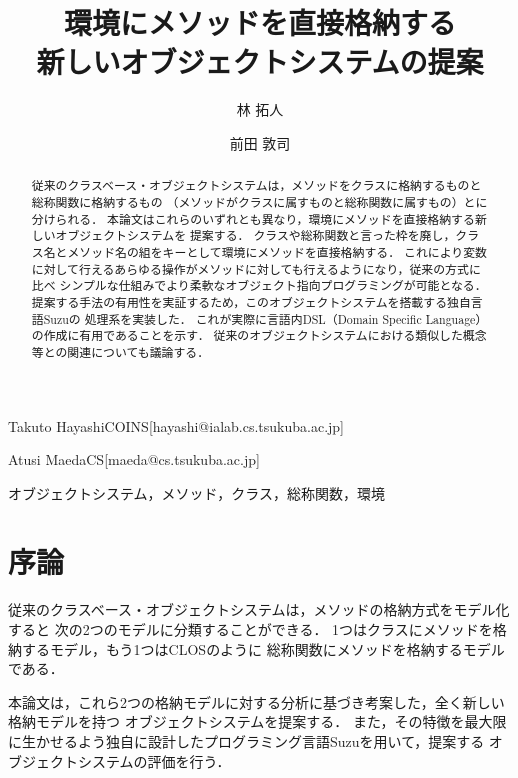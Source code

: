 \documentclass{ipsjprosym}
\begin{document}
\title{環境にメソッドを直接格納する \\ 新しいオブジェクトシステムの提案}


\author{林 拓人}{Takuto Hayashi}{COINS}[hayashi@ialab.cs.tsukuba.ac.jp]
\author{前田 敦司}{Atusi Maeda}{CS}[maeda@cs.tsukuba.ac.jp]

\begin{abstract}
従来のクラスベース・オブジェクトシステムは，メソッドをクラスに格納するものと総称関数に格納するもの
（メソッドがクラスに属すものと総称関数に属すもの）とに分けられる．
本論文はこれらのいずれとも異なり，環境にメソッドを直接格納する新しいオブジェクトシステムを
提案する．
クラスや総称関数と言った枠を廃し，クラス名とメソッド名の組をキーとして環境にメソッドを直接格納する．
これにより変数に対して行えるあらゆる操作がメソッドに対しても行えるようになり，従来の方式に比べ
シンプルな仕組みでより柔軟なオブジェクト指向プログラミングが可能となる．
提案する手法の有用性を実証するため，このオブジェクトシステムを搭載する独自言語Suzuの
処理系を実装した．
これが実際に言語内DSL（Domain Specific Language）の作成に有用であることを示す．
従来のオブジェクトシステムにおける類似した概念等との関連についても議論する．
\end{abstract}

\begin{jkeyword}
オブジェクトシステム，メソッド，クラス，総称関数，環境
\end{jkeyword}

\maketitle

\section{序論}

従来のクラスベース・オブジェクトシステムは，メソッドの格納方式をモデル化すると
次の2つのモデルに分類することができる．
1つはクラスにメソッドを格納するモデル，もう1つはCLOS\cite{Ida:2010}のように
総称関数にメソッドを格納するモデルである．

本論文は，これら2つの格納モデルに対する分析に基づき考案した，全く新しい格納モデルを持つ
オブジェクトシステムを提案する．
また，その特徴を最大限に生かせるよう独自に設計したプログラミング言語Suzuを用いて，提案する
オブジェクトシステムの評価を行う．
\end{document}
